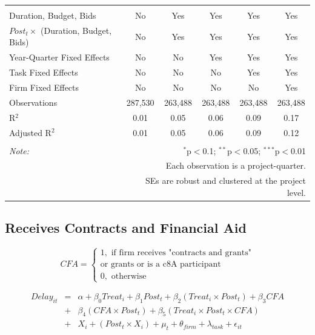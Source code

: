 \documentclass[
]{article}
\begin{document}
\begin{table}[H]
\begin{tabular}{@{\extracolsep{-2pt}}lccccc}
\hline \\[-1.8ex] 
Duration, Budget, Bids & No & Yes & Yes & Yes & Yes \\ 
$Post_t \times $  (Duration, Budget, Bids) & No & Yes & Yes & Yes & Yes \\ 
Year-Quarter Fixed Effects & No & No & Yes & Yes & Yes \\ 
Task Fixed Effects & No & No & No & Yes & Yes \\ 
Firm Fixed Effects & No & No & No & No & Yes \\ 
Observations & 287,530 & 263,488 & 263,488 & 263,488 & 263,488 \\ 
R$^{2}$ & 0.01 & 0.05 & 0.06 & 0.09 & 0.17 \\ 
Adjusted R$^{2}$ & 0.01 & 0.05 & 0.06 & 0.09 & 0.12 \\ 
\hline 
\hline \\[-1.8ex] 
\textit{Note:}  & \multicolumn{5}{r}{$^{*}$p$<$0.1; $^{**}$p$<$0.05; $^{***}$p$<$0.01} \\ 
 & \multicolumn{5}{r}{Each observation is a project-quarter.} \\ 
 & \multicolumn{5}{r}{SEs are robust and clustered at the project level.} \\ 
\end{tabular} 
\end{table}

\hypertarget{receives-contracts-and-financial-aid}{%
\subsection{Receives Contracts and Financial
Aid}\label{receives-contracts-and-financial-aid}}

\[ CFA = \begin{cases} 1, \text{ if firm receives "contracts and grants"}\\ 
                       \text{or grants or is a c8A participant}\\
0, \text{ otherwise} \end{cases}\]

\[ \begin{aligned}
Delay_{it} &=& \alpha+\beta_0 Treat_i + \beta_1 Post_t + \beta_2 (Treat_i \times Post_t) +\beta_3 CFA \\
&+& \beta_4 (CFA \times Post_t) + \beta_5 (Treat_i \times Post_t \times CFA) \\ 
&+&X_i + (Post_t \times X_i) + \mu_t + \theta_{firm} + \lambda_{task}+ \epsilon_{it}
\end{aligned}\]
\end{document}

